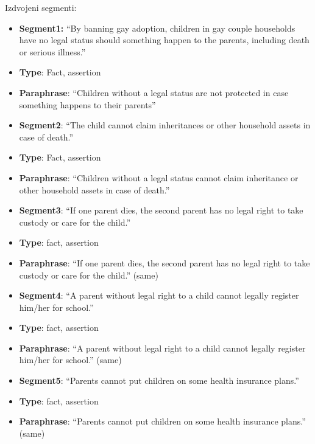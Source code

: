 \noindent Izdvojeni segmenti:
\begin{itemize}
\item[] \textbf{Segment1:} ``By banning gay adoption, children in gay couple
households have no legal status should something happen to the parents,
including death or serious illness.''
\item[] \textbf{Type}: Fact, assertion
\item[] \textbf{Paraphrase}: ``Children without a legal status are not
protected in case something happens to their parents''
\end{itemize}

\begin{itemize}[topsep=0.3cm]
\item[] \textbf{Segment2}: ``The child cannot claim inheritances or other household assets in case of death.''
\item[] \textbf{Type}: Fact, assertion
\item[] \textbf{Paraphrase}: ``Children without a legal status cannot claim
inheritance or other household assets in case of death.''
\end{itemize} 

\begin{itemize}[topsep=0.3cm]
\item[] \textbf{Segment3}: ``If one parent dies, the second parent has no legal
right to take custody or care for the child.''
\item[] \textbf{Type}: fact, assertion
\item[] \textbf{Paraphrase}: ``If one parent dies, the second parent has no legal
right to take custody or care for the child.'' (same)

\end{itemize}

\begin{itemize}[topsep=0.3cm]
\item[] \textbf{Segment4}: ``A parent without legal right to a child cannot
legally register him/her for school.''
\item[] \textbf{Type}: fact, assertion
\item[] \textbf{Paraphrase}: ``A parent without legal right to a child cannot
legally register him/her for school.'' (same)
\end{itemize}

\begin{itemize}[topsep=0.3cm]
\item[] \textbf{Segment5}: ``Parents cannot put children on some health insurance plans.''
\item[] \textbf{Type}: fact, assertion
\item[] \textbf{Paraphrase}: ``Parents cannot put children on some health insurance plans.'' (same)

\end{itemize}


